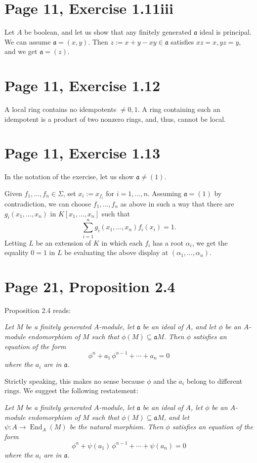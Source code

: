 \documentclass[12pt]{article}
\newcommand{\oo}{\operatorname}
\newcommand{\mf}{\mathfrak}
\newcommand{\aaa}{\mf a}
\begin{document}
\section{Page 11, Exercise 1.11iii}%

Let $A$ be boolean, and let us show that any finitely generated $\aaa$ ideal is principal. We can assume $\aaa=(x,y)$. Then $z:=x+y-xy\in\aaa$ satisfies $xz=x,yz=y$, and we get $\aaa=(z)$.

\section{Page 11, Exercise 1.12}%

A local ring contains no idempotents $\neq0,1$. A ring containing such an idempotent is a product of two nonzero rings, and, thus, cannot be local.

\section{Page 11, Exercise 1.13}%

In the notation of the exercise, let us show $\aaa\neq(1)$. 

Given $f_1,\dots,f_n\in\Sigma$, set $x_i:=x_{f_i}$ for $i=1,\dots,n$. Assuming $\aaa=(1)$ by contradiction, we can choose $f_1,\dots,f_n$ as above in such a way that there are $g_i(x_1,\dots,x_n)$ in $K[x_1,\dots,x_n]$ such that 
$$
\sum_{i=1}^n g_i(x_1,\dots,x_n)f_i(x_i)=1.
$$ 
Letting $L$ be an extension of $K$ in which each $f_i$ has a root $\alpha_i$, we get the equality $0=1$ in $L$ be evaluating the above display at $(\alpha_1,\dots,\alpha_n)$.

\section{Page 21, Proposition 2.4}%

Proposition 2.4 reads:

\emph{Let $M$ be a finitely generated $A$-module, let $\mf a$ be an ideal of $A$, and let $\phi$ be an $A$-module endomorphism of $M$ such that $\phi(M)\subseteq\mf a M$. Then $\phi$ satisfies an equation of the form
$$
\phi^n+a_1\,\phi^{n-1}+\cdots+a_n=0
$$ 
where the $a_i$ are in $\mf a$.}

Strictly speaking, this makes no sense because $\phi$ and the $a_i$ belong to different rings. We suggest the following restatement:

\emph{Let $M$ be a finitely generated $A$-module, let $\mf a$ be an ideal of $A$, let $\phi$ be an $A$-module endomorphism of $M$ such that $\phi(M)\subseteq\mf a M$, and let $\psi:A\to\oo{End}_A(M)$ be the natural morphism. Then $\phi$ satisfies an equation of the form
$$
\phi^n+\psi(a_1)\,\phi^{n-1}+\cdots+\psi(a_n)=0
$$ 
where the $a_i$ are in $\mf a$.}
\end{document}

